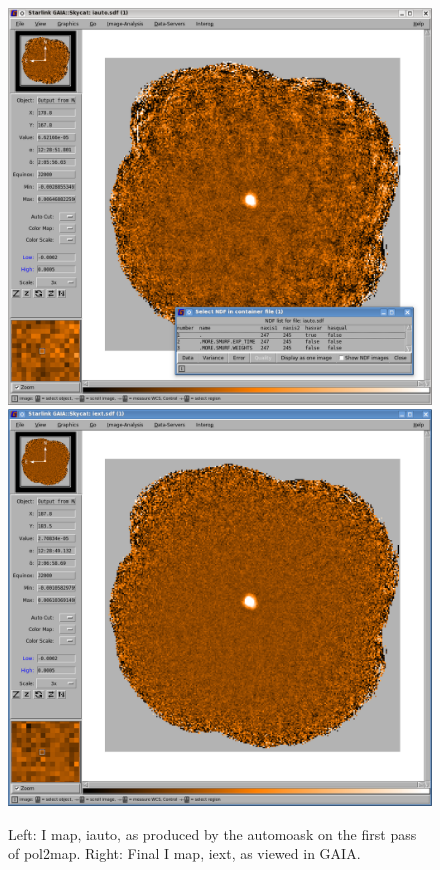 \begin{figure}[t!]
\begin{center}
\includegraphics[width=0.46\linewidth]{sc22-gaia-view-iauto.png}
\includegraphics[width=0.46\linewidth]{sc22-gaia-view-iext.png}
\label{fig:gaia-iext}
\caption [Final I map in GAIA]{
  \small Left: I map, iauto, as produced by the automoask on the first pass of pol2map. Right: Final I map, iext, as viewed in GAIA.
}
\end{center}
\end{figure}


